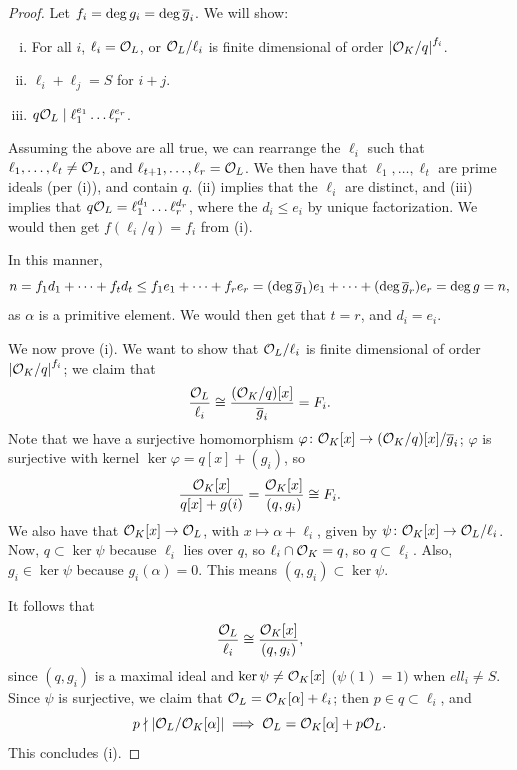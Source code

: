 \begin{proof}
    Let $f_i = \deg g_i = \deg \overline g_i$. We will show:
    \begin{enumerate}[(i)]
        \item For all $i$, $\ell_i = \mathcal O_L$, or $\mathcal O_L/\ell_i$ is finite dimensional of order $\left\lvert \mathcal O_K / q \right\rvert^{f_i}$.
        \item $\ell_i + \ell_j = S$ for $i + j$.
        \item $q \mathcal O_L \mid \ell_1^{e_1} \dots \ell_r^{e_r}$.
    \end{enumerate}
    Assuming the above are all true, we can rearrange the $\ell_i$ such that $\ell_1, \dots, \ell_t \neq \mathcal O_L$, and $\ell_{t+1}, \dots, \ell_r = \mathcal O_L$. We then have that $\ell_1, \dots, \ell_t$ are prime ideals (per (i)), and contain $q$. (ii) implies that the $\ell_i$ are distinct, and (iii) implies that $q \mathcal O_L = \ell_1^{d_1} \dots \ell_r^{d_r}$, where the $d_i \leq e_i$ by unique factorization. We would then get $f(\ell_i / q) = f_i$ from (i).

    In this manner,
    \[ n = f_1d_1 + \dots + f_td_t \leq f_1e_1 + \dots + f_re_r = (\deg \overline g_1) e_1 + \dots + (\deg \overline g_r) e_r = \deg g = n, \]
    as $\alpha$ is a primitive element. We would then get that $t = r$, and $d_i = e_i$.

    We now prove (i). We want to show that $\mathcal O_L/\ell_i$ is finite dimensional of order $\left\lvert \mathcal O_K/q \right\rvert^{f_i}$; we claim that
    \[ \frac{\mathcal O_L}{\ell_i} \cong \frac{(\mathcal O_K/q)[x]}{\overline g_i} = F_i. \]
    Note that we have a surjective homomorphism $\varphi \colon \mathcal O_K[x] \to (\mathcal O_K / q) [x] / \overline g_i$; $\varphi$ is surjective with kernel $\ker \varphi = q[x] + (g_i)$, so
    \[ \frac{\mathcal O_K[x]}{q[x] + g(i)} = \frac{\mathcal O_K[x]}{(q, g_i)} \cong F_i. \]
    We also have that $\mathcal O_K[x] \to \mathcal O_L$, with $x \mapsto \alpha + \ell_i$, given by $\psi \colon \mathcal O_K[x] \to \mathcal O_L/\ell_i$. Now, $q \subset \ker \psi$ because $\ell_i$ lies over $q$, so $\ell_i \cap \mathcal O_K = q$, so $q \subset \ell_i$. Also, $g_i \in \ker \psi$ because $g_i(\alpha) = 0$. This means $(q, g_i) \subset \ker \psi$.

    It follows that
    \[ \frac{\mathcal O_L}{\ell_i} \cong \frac{\mathcal O_K[x]}{(q, g_i)}, \]
    since $(q, g_i)$ is a maximal ideal and $\ker \psi \neq \mathcal O_K[x]$ ($\psi(1) = 1)$ when $ell_i \neq S$. Since $\psi$ is surjective, we claim that $\mathcal O_L = \mathcal O_K[\alpha] + \ell_i$; then $p \in q \subset \ell_i$, and
    \[ p \nmid \left\lvert \mathcal O_L / \mathcal O_K[\alpha] \right\rvert \implies \mathcal O_L = \mathcal O_K[\alpha] + p \mathcal O_L. \]
    This concludes (i).


\end{proof}
